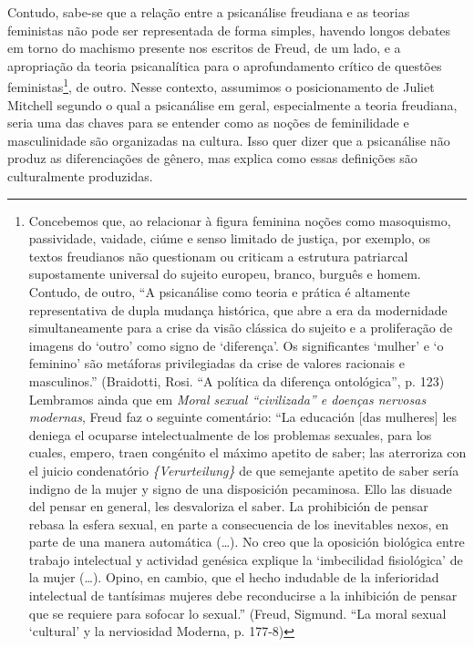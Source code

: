 Contudo, sabe-se que a relação entre a psicanálise freudiana e as
teorias feministas não pode ser representada de forma simples, havendo
longos debates em torno do machismo presente nos escritos de Freud, de
um lado, e a apropriação da teoria psicanalítica para o aprofundamento
crítico de questões feministas\footnote{Concebemos que, ao relacionar à
  figura feminina noções como masoquismo, passividade, vaidade, ciúme e
  senso limitado de justiça, por exemplo, os textos freudianos não
  questionam ou criticam a estrutura patriarcal supostamente universal
  do sujeito europeu, branco, burguês e homem. Contudo, de outro, ``A
  psicanálise como teoria e prática é altamente representativa de dupla
  mudança histórica, que abre a era da modernidade simultaneamente para
  a crise da visão clássica do sujeito e a proliferação de imagens do
  `outro' como signo de `diferença'. Os significantes `mulher' e `o
  feminino' são metáforas privilegiadas da crise de valores racionais e
  masculinos.'' (Braidotti, Rosi. ``A política da diferença
  ontológica'', p. 123) Lembramos ainda que em \emph{Moral sexual
  ``civilizada'' e doenças nervosas modernas}, Freud faz o seguinte
  comentário: ``La educación {[}das mulheres{]} les deniega el ocuparse
  intelectualmente de los problemas sexuales, para los cuales, empero,
  traen congénito el máximo apetito de saber; las aterroriza con el
  juicio condenatório \emph{\{Verurteilung\}} de que semejante apetito
  de saber sería indigno de la mujer y signo de una disposición
  pecaminosa. Ello las disuade del pensar en general, les desvaloriza el
  saber. La prohibición de pensar rebasa la esfera sexual, en parte a
  consecuencia de los inevitables nexos, en parte de una manera
  automática (\ldots{}). No creo que la oposición biológica entre trabajo
  intelectual y actividad genésica explique la `imbecilidad fisiológica'
  de la mujer (\ldots{}). Opino, en cambio, que el hecho indudable de la
  inferioridad intelectual de tantísimas mujeres debe reconducirse a la
  inhibición de pensar que se requiere para sofocar lo sexual.'' (Freud,
  Sigmund. ``La moral sexual `cultural' y la nerviosidad Moderna, p.
  177-8)}, de outro. Nesse contexto, assumimos o posicionamento de
Juliet Mitchell segundo o qual a psicanálise em geral, especialmente a
teoria freudiana, seria uma das chaves para se entender como as noções
de feminilidade e masculinidade são organizadas na cultura. Isso quer
dizer que a psicanálise não produz as diferenciações de gênero, mas
explica como essas definições são culturalmente produzidas.

